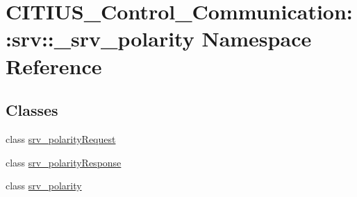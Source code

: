 \hypertarget{namespace_c_i_t_i_u_s___control___communication_1_1srv_1_1__srv__polarity}{\section{\-C\-I\-T\-I\-U\-S\-\_\-\-Control\-\_\-\-Communication\-:\-:srv\-:\-:\-\_\-srv\-\_\-polarity \-Namespace \-Reference}
\label{namespace_c_i_t_i_u_s___control___communication_1_1srv_1_1__srv__polarity}
}
\subsection*{\-Classes}
\begin{DoxyCompactItemize}
\item 
class \hyperlink{class_c_i_t_i_u_s___control___communication_1_1srv_1_1__srv__polarity_1_1srv__polarity_request}{srv\-\_\-polarity\-Request}
\item 
class \hyperlink{class_c_i_t_i_u_s___control___communication_1_1srv_1_1__srv__polarity_1_1srv__polarity_response}{srv\-\_\-polarity\-Response}
\item 
class \hyperlink{class_c_i_t_i_u_s___control___communication_1_1srv_1_1__srv__polarity_1_1srv__polarity}{srv\-\_\-polarity}
\end{DoxyCompactItemize}
